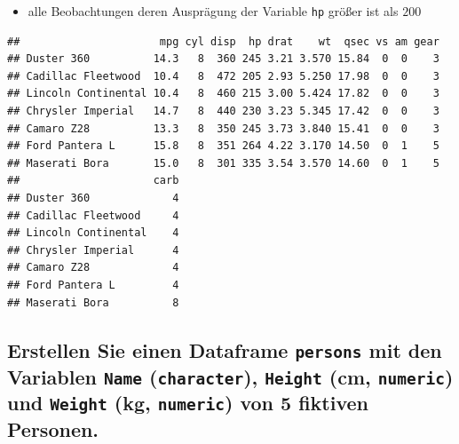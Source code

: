 \documentclass[12pt,a4paper]{article}
\newenvironment{Shaded}{\begin{snugshade}}{\end{snugshade}}
\newcommand{\DecValTok}[1]{\textcolor[rgb]{0.00,0.00,0.81}{#1}}
\newcommand{\NormalTok}[1]{#1}
\newcommand{\SpecialCharTok}[1]{\textcolor[rgb]{0.00,0.00,0.00}{#1}}
\begin{document}
\begin{itemize}
  \item alle Beobachtungen deren Ausprägung der Variable \texttt{hp} größer ist als $200$
\end{itemize}

\begin{Shaded}
\end{Shaded}

\begin{verbatim}
##                      mpg cyl disp  hp drat    wt  qsec vs am gear
## Duster 360          14.3   8  360 245 3.21 3.570 15.84  0  0    3
## Cadillac Fleetwood  10.4   8  472 205 2.93 5.250 17.98  0  0    3
## Lincoln Continental 10.4   8  460 215 3.00 5.424 17.82  0  0    3
## Chrysler Imperial   14.7   8  440 230 3.23 5.345 17.42  0  0    3
## Camaro Z28          13.3   8  350 245 3.73 3.840 15.41  0  0    3
## Ford Pantera L      15.8   8  351 264 4.22 3.170 14.50  0  1    5
## Maserati Bora       15.0   8  301 335 3.54 3.570 14.60  0  1    5
##                     carb
## Duster 360             4
## Cadillac Fleetwood     4
## Lincoln Continental    4
## Chrysler Imperial      4
## Camaro Z28             4
## Ford Pantera L         4
## Maserati Bora          8
\end{verbatim}

\hypertarget{erstellen-sie-einen-dataframe-persons-mit-den-variablen-name-character-height-cm-numeric-und-weight-kg-numeric-von-5-fiktiven-personen.}{%
\subsection{\texorpdfstring{Erstellen Sie einen Dataframe
\texttt{persons} mit den Variablen \texttt{Name} (\texttt{character}),
\texttt{Height} (cm, \texttt{numeric}) und \texttt{Weight} (kg,
\texttt{numeric}) von 5 fiktiven
Personen.}{Erstellen Sie einen Dataframe persons mit den Variablen Name (character), Height (cm, numeric) und Weight (kg, numeric) von 5 fiktiven Personen.}}\label{erstellen-sie-einen-dataframe-persons-mit-den-variablen-name-character-height-cm-numeric-und-weight-kg-numeric-von-5-fiktiven-personen.}}
\end{document}
